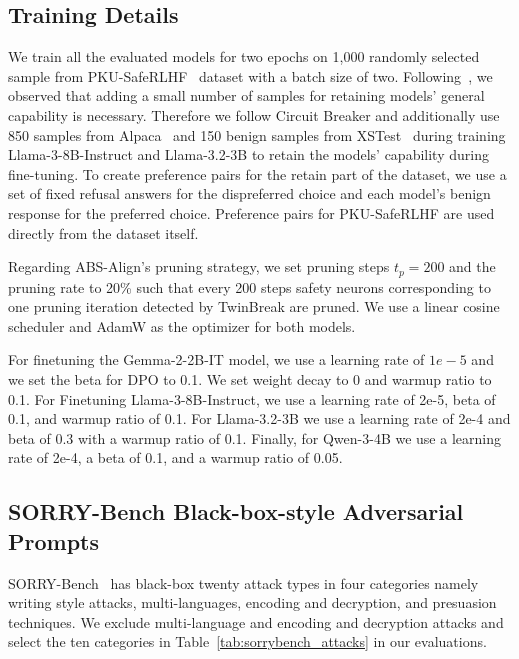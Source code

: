 \appendix

\renewcommand{\thesubsection}{\arabic{subsection}}

\subsection{Training Details}
\label{appendix:training}
We train all the evaluated models for two epochs on 1,000 randomly selected sample from PKU-SafeRLHF~\cite{ji2024pku} dataset with a batch size of two. Following~\cite{zou2024circuit}, we observed that adding a small number of samples for retaining models' general capability is necessary. Therefore we follow Circuit Breaker and additionally use 850 samples from Alpaca~\cite{alpaca} and 150 benign samples from XSTest~\cite{rottger2024xstest} during training Llama-3-8B-Instruct and Llama-3.2-3B to retain the models' capability during fine-tuning. To create preference pairs for the retain part of the dataset, we use a set of fixed refusal answers for the dispreferred choice and each model's benign response for the preferred choice. Preference pairs for PKU-SafeRLHF are used directly from the dataset itself.

Regarding ABS-Align's pruning strategy, we set pruning steps $t_p = 200$ and the pruning rate to 20\% such that every 200 steps safety neurons corresponding to one pruning iteration detected by TwinBreak are pruned. We use a linear cosine scheduler and AdamW as the optimizer for both models.


For finetuning the Gemma-2-2B-IT model, we use a learning rate of $1e-5$ and we set the beta for DPO to 0.1. We set weight decay to 0 and warmup ratio to 0.1. For Finetuning Llama-3-8B-Instruct, we use a learning rate of 2e-5, beta of 0.1, and warmup ratio of 0.1. For Llama-3.2-3B we use a learning rate of 2e-4 and beta of 0.3 with a warmup ratio of 0.1. Finally, for Qwen-3-4B we use a learning rate of 2e-4, a beta of 0.1, and a warmup ratio of 0.05.

\subsection{SORRY-Bench Black-box-style Adversarial Prompts}
\label{appendix:sorry_bench}
SORRY-Bench~\cite{xie2025sorrybench} has black-box twenty attack types in four categories namely writing style attacks, multi-languages, encoding and decryption, and presuasion techniques. We exclude multi-language and encoding and decryption attacks and select the ten categories in Table~\ref{tab:sorrybench_attacks} in our evaluations.


